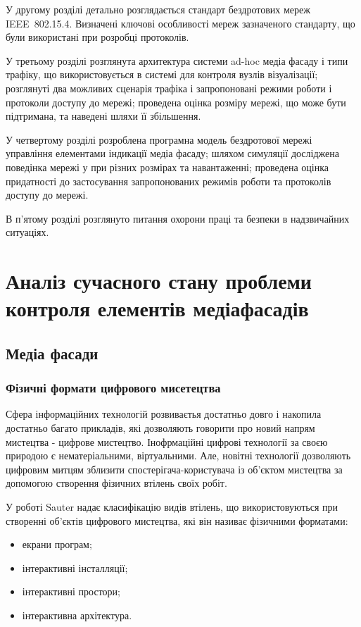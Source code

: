 \documentclass[a4paper,ukrainian,utf8,nocolumnsxix,floatsection,equationsection]{eskdtext}
\renewcommand\paragraph{\subsubsection}
\let\stdsection\section
\renewcommand\section{\clearpage\stdsection}
\newcommand{\iee}[0]{IEEE~802.15.4\xspace}
\begin{document}
У другому розділі детально розглядається стандарт бездротових мереж \iee. Визначені ключові особливості мереж зазначеного стандарту, що були використані при розробці протоколів.

У третьому розділі розглянута архитектура системи ad-hoc медіа фасаду і типи трафіку, що використовується в системі для контроля вузлів візуалізації; розглянуті два можливих сценарія трафіка і запропоновані режими роботи і протоколи доступу до мережі; проведена оцінка розміру мережі, що може бути підтримана, та наведені шляхи її збільшення.

У четвертому розділі розроблена програмна модель бездротової мережі управління елементами індикації медіа фасаду; шляхом симуляції досліджена поведінка мережі у при різних розмірах та навантаженні; проведена оцінка придатності до застосування запропонованих режимів роботи та протоколів доступу до мережі.

В п’ятому розділі розглянуто питання охорони праці та безпеки в надзвичайних ситуаціях.

\section{Аналіз сучасного стану проблеми контроля елементів медіафасадів} %
\label{sec:1}

\subsection{Медіа фасади}


\paragraph{Фізичні формати цифрового мисетецтва} %
\label{par:digital_art_physical_formats}

Сфера інформаційних технологій розвиваєтья достатньо довго і накопила достатньо багато прикладів, які дозволяють говорити про новий напрям мистецтва - цифрове мистецтво. Інофрмаційні цифрові технології за своєю природою є нематеріальними, віртуальними. Але, новітні технології дозволяють цифровим митцям зблизити спостерігача-користувача із об’єктом мистецтва за допомогою створення фізичних втілень своїх робіт. 

У роботі \cite{sauter:vierte:format} Sauter надає класифікацію видів втілень, що використовуються при створенні об’єктів цифрового мистецтва, які він називає фізичними форматами:

\begin{itemize}
	\item екрани програм;
	\item інтерактивні інсталляції;
	\item інтерактивні простори;
	\item інтерактивна архітектура.
\end{itemize}
\end{document}

